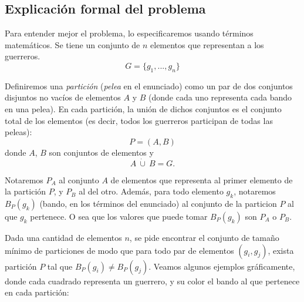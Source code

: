 
\subsection{Explicación formal del problema}

Para entender mejor el problema, lo especificaremos usando términos matemáticos. Se tiene un conjunto de $n$ elementos que representan a los guerreros. 
\[G = \{g_1,...,g_n\}\]

Definiremos una \emph{partición} (\emph{pelea} en el enunciado) como un par de dos conjuntos disjuntos no vacíos de elementos $A$ y $B$ (donde cada uno representa cada bando en una pelea). En cada partición, la unión de dichos conjuntos es el conjunto total de los elementos (es decir, todos los guerreros participan de todas las peleas):
\[ P = (A, B)\]
donde $A$, $B$ son conjuntos de elementos y  \[A \ \dot{\cup}\ B = G.\]

Notaremos $P_A$ al conjunto $A$ de elementos que representa al primer elemento de la partición $P$, y $P_B$ al del otro. Además, para todo elemento $g_k$, notaremos $B_P(g_k)$ (bando, en los t\'erminos del enunciado) al conjunto de la particion $P$ al que $g_k$ pertenece. O sea que los valores que puede tomar $B_P(g_k)$ son $P_A$ o $P_B$. 

Dada una cantidad de elementos $n$, se pide encontrar el conjunto de tamaño mínimo de particiones de modo que para todo par de elementos $(g_i, g_j)$, exista partición $P$ tal que $B_P(g_i) \neq B_P(g_j)$. Veamos algunos ejemplos gráficamente, donde cada cuadrado representa un guerrero, y su color el bando al que pertenece en cada partición:

